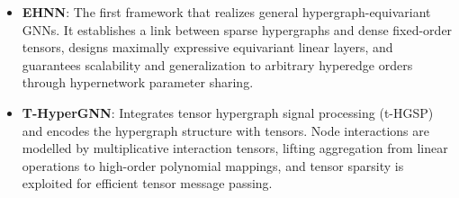 \begin{itemize}
    \vspace{0.5em} %
    
    \item \textbf{EHNN}\cite{kim2022equivariant}: The first framework that realizes general hypergraph-equivariant GNNs. It establishes a link between sparse hypergraphs and dense fixed-order tensors, designs maximally expressive equivariant linear layers, and guarantees scalability and generalization to arbitrary hyperedge orders through hypernetwork parameter sharing.
    \item \textbf{T-HyperGNN}\cite{wang2024thypergnns,pena2023thgsp}: Integrates tensor hypergraph signal processing (t-HGSP) and encodes the hypergraph structure with tensors. Node interactions are modelled by multiplicative interaction tensors, lifting aggregation from linear operations to high-order polynomial mappings, and tensor sparsity is exploited for efficient tensor message passing.
\end{itemize}
